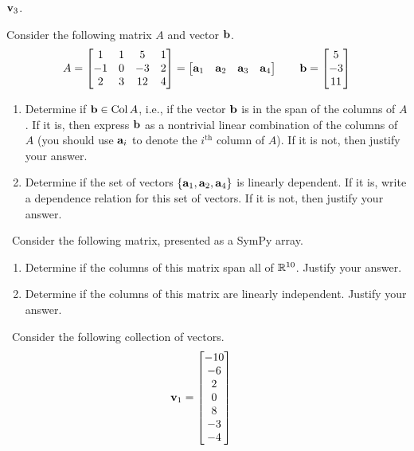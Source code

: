 \begin{tasks}[resume, style=enumerate]
\begin{itemize}
    $\mathbf v_3$.
  \end{itemize}
\task
  Consider the following matrix $A$ and vector $\mathbf b$.
  \begin{displaymath}
    A =
    \begin{bmatrix}
      1 & 1 & 5 & 1 \\
      -1 & 0 & -3 & 2 \\
      2 & 3 & 12 & 4 \\
    \end{bmatrix}
    =
    \begin{bmatrix}
      \mathbf a_1 & \mathbf a_2 & \mathbf a_3 & \mathbf a_4
    \end{bmatrix}
    \qquad
    \mathbf b =
    \begin{bmatrix}
      5 \\ -3 \\ 11
    \end{bmatrix}
  \end{displaymath}
  \begin{enumerate}[label=(\alph*)]
  \item
    Determine if $\mathbf b \in \operatorname{\mathrm{Col}} A$, i.e., if the vector $\mathbf b$ is in the
    span of the columns of $A$. If it is, then express $\mathbf b$ as a
    nontrivial linear combination of the columns of $A$ (you should
    use $\mathbf a_i$ to denote the $i^{\text{th}}$ column of $A$). If it
    is not, then justify your answer.
  \item
    Determine if the set of vectors $\{ \mathbf a_1, \mathbf a_2, \mathbf a_4 \}$ is
    linearly dependent.  If it is, write a dependence relation for
    this set of vectors. If it is not, then justify your answer.
  \end{enumerate}
\task
  \faCalculator \ Consider the following matrix, presented as a SymPy
  array.
  
  \begin{enumerate}[label=(\alph*)]
  \item Determine if the columns of this matrix span all of
    $\mathbb R^{10}$. Justify your answer.
  \item Determine if the columns of this matrix are linearly
    independent. Justify your answer.
  \end{enumerate}
\task \faCalculator \
  Consider the following collection of vectors.
  \begin{align*}
    &\vv_1 =
    \begin{bmatrix} -10 \\ -6 \\ 2 \\ 0 \\ 8 \\ -3 \\ -4 \end{bmatrix}

\end{align*}
\end{tasks}
